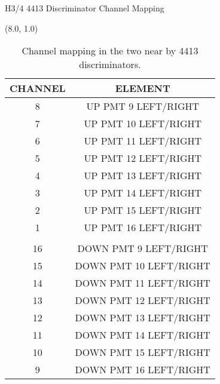 \documentclass[10pt, xcolor={dvipsnames}, aspectratio = 169, sans,mathserif]{beamer}
\begin{document}
\begin{frame}{H3/4 4413 Discriminator Channel Mapping}
\begin{textblock}{7.0}(8.0, 1.0)
\begin{table}
\begin{center}
\begin{tabular}{
    |>{\columncolor{lime!20}}c
    |>{\columncolor{blue!20}}c|
}
\hline
CHANNEL & ELEMENT \\
\hline
8 & UP PMT 9 LEFT/RIGHT \\
7 & UP PMT 10 LEFT/RIGHT \\
6 & UP PMT 11 LEFT/RIGHT \\
5 & UP PMT 12 LEFT/RIGHT \\
4 & UP PMT 13 LEFT/RIGHT \\
3 & UP PMT 14 LEFT/RIGHT \\
2 & UP PMT 15 LEFT/RIGHT \\
1 & UP PMT 16 LEFT/RIGHT \\
  &                     \\
16 & DOWN PMT 9 LEFT/RIGHT \\
15 & DOWN PMT 10 LEFT/RIGHT \\
14 & DOWN PMT 11 LEFT/RIGHT \\
13 & DOWN PMT 12 LEFT/RIGHT \\
12 & DOWN PMT 13 LEFT/RIGHT \\
11 & DOWN PMT 14 LEFT/RIGHT \\
10 & DOWN PMT 15 LEFT/RIGHT \\
9  & DOWN PMT 16 LEFT/RIGHT \\
\hline
\end{tabular}
\caption{Channel mapping in the two near by 4413 discriminators.}
\end{center}
\end{table}
\end{textblock}

\end{frame}
\end{document}
